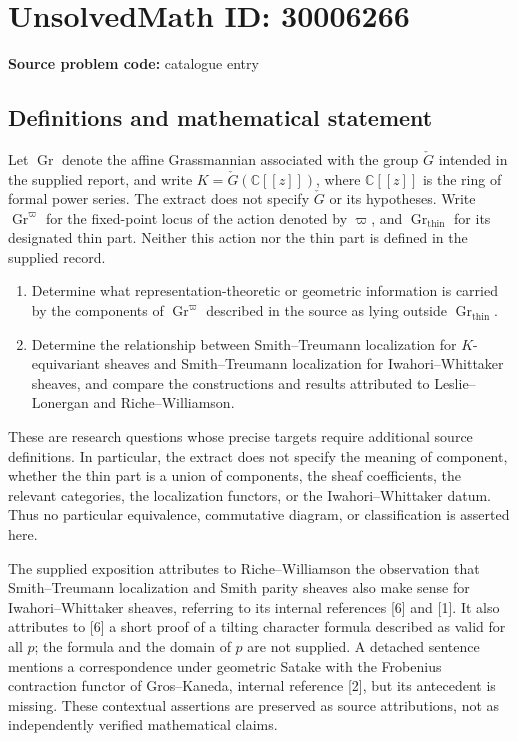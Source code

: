 \documentclass[11pt]{article}
\newcommand{\C}{\mathbb{C}}
\begin{document}
\section*{UnsolvedMath ID: 30006266}
\textbf{Source problem code:} catalogue entry
\subsection{Definitions and mathematical statement}
Let \(\operatorname{Gr}\) denote the affine Grassmannian associated with the group \(\check G\) intended in the supplied report, and write \(K=\check G(\C[[z]])\), where \(\C[[z]]\) is the ring of formal power series. The extract does not specify \(\check G\) or its hypotheses. Write \(\operatorname{Gr}^{\varpi}\) for the fixed-point locus of the action denoted by \(\varpi\), and \(\operatorname{Gr}_{\mathrm{thin}}\) for its designated thin part. Neither this action nor the thin part is defined in the supplied record.

\begin{enumerate}
\item Determine what representation-theoretic or geometric information is carried by the components of \(\operatorname{Gr}^{\varpi}\) described in the source as lying outside \(\operatorname{Gr}_{\mathrm{thin}}\).
\item Determine the relationship between Smith--Treumann localization for \(K\)-equivariant sheaves and Smith--Treumann localization for Iwahori--Whittaker sheaves, and compare the constructions and results attributed to Leslie--Lonergan and Riche--Williamson.
\end{enumerate}

These are research questions whose precise targets require additional source definitions. In particular, the extract does not specify the meaning of component, whether the thin part is a union of components, the sheaf coefficients, the relevant categories, the localization functors, or the Iwahori--Whittaker datum. Thus no particular equivalence, commutative diagram, or classification is asserted here.

The supplied exposition attributes to Riche--Williamson the observation that Smith--Treumann localization and Smith parity sheaves also make sense for Iwahori--Whittaker sheaves, referring to its internal references [6] and [1]. It also attributes to [6] a short proof of a tilting character formula described as valid for all \(p\); the formula and the domain of \(p\) are not supplied. A detached sentence mentions a correspondence under geometric Satake with the Frobenius contraction functor of Gros--Kaneda, internal reference [2], but its antecedent is missing. These contextual assertions are preserved as source attributions, not as independently verified mathematical claims.
\end{document}
